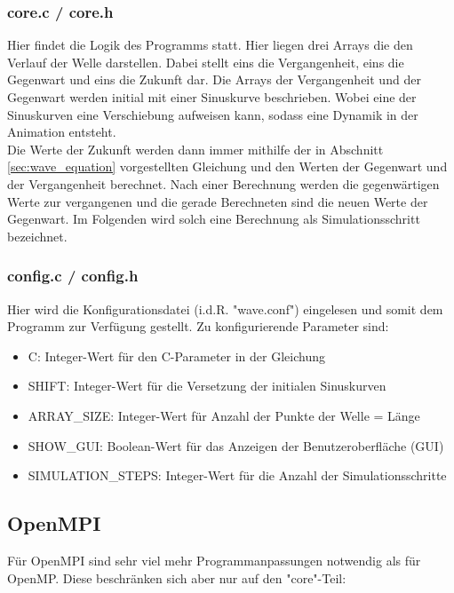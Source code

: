 \subsubsection{core.c / core.h}
Hier findet die Logik des Programms statt. Hier liegen drei Arrays die den Verlauf der Welle darstellen. Dabei stellt eins die Vergangenheit, eins die Gegenwart und eins die Zukunft dar. Die Arrays der Vergangenheit und der Gegenwart werden initial mit einer Sinuskurve beschrieben. Wobei eine der Sinuskurven eine Verschiebung aufweisen kann, sodass eine Dynamik in der Animation entsteht.\\
Die Werte der Zukunft werden dann immer mithilfe der in Abschnitt \ref{sec:wave_equation} vorgestellten Gleichung und den Werten der Gegenwart und der Vergangenheit berechnet. Nach einer Berechnung werden die gegenwärtigen Werte zur vergangenen und die gerade Berechneten sind die neuen Werte der Gegenwart. Im Folgenden wird solch eine Berechnung als Simulationsschritt bezeichnet.

\subsubsection{config.c / config.h}
Hier wird die Konfigurationsdatei (i.d.R. "wave.conf") eingelesen und somit dem Programm zur Verfügung gestellt. Zu konfigurierende Parameter sind:
\begin{itemize}
	\item C: Integer-Wert für den C-Parameter in der Gleichung
	\item SHIFT: Integer-Wert für die Versetzung der initialen Sinuskurven
	\item ARRAY\_SIZE: Integer-Wert für Anzahl der Punkte der Welle = Länge
	\item SHOW\_GUI: Boolean-Wert für das Anzeigen der Benutzeroberfläche (GUI)
	\item SIMULATION\_STEPS: Integer-Wert für die Anzahl der Simulationsschritte
\end{itemize}

\subsection{OpenMPI}
Für OpenMPI sind sehr viel mehr Programmanpassungen notwendig als für OpenMP. Diese beschränken sich aber nur auf den "core"-Teil:
